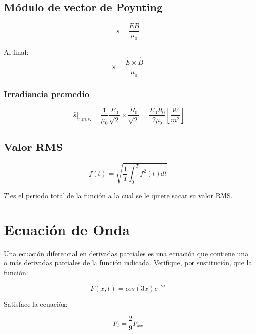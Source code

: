 \documentclass[]{article}
\begin{document}
\subsection{Módulo de vector de Poynting}

\begin{equation}
   s=\frac{EB}{\mu_0}
\end{equation}

Al final:\\

\begin{equation}
\hat{s}=\frac{\hat{E} \times \hat{B}}{\mu_0}
\end{equation}

\subsubsection{Irradiancia promedio}

\begin{equation}
    |\hat{s}|_{r.m.s.}=\frac{1}{\mu_0}\frac{E_0}{\sqrt{2}} \times \frac{B_0}{\sqrt{2}}=\frac{E_0 B_0}{2 \mu_0} [\frac{W}{m^2}]
\end{equation}

\subsection{Valor RMS}

\begin{equation}
 f(t)=\sqrt{\frac{1}{T} \int_0^T f^2(t)dt}
\end{equation}

$T$ es el periodo total de la función a la cual se le quiere sacar su valor RMS.\\

\section{Ecuación de Onda}



Una ecuación diferencial en derivadas parciales es una ecuación que contiene una o más derivadas parciales de la función indicada. Verifique, por sustitución, que la función:

\begin{equation}
F(x,t)=cos(3x)e^{-2t}
\end{equation}

Satisface la ecuación:

\begin{equation}
F_t=\frac{2}{9}F_{xx}
\end{equation}
\end{document}
